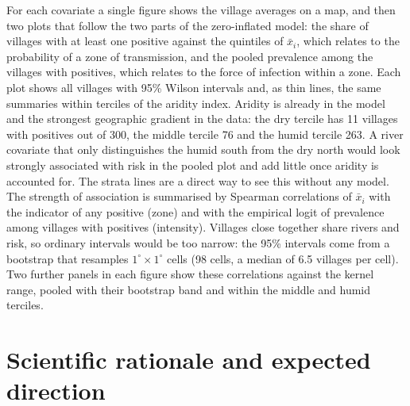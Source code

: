 \documentclass[11pt,a4paper]{article}
\begin{document}
For each covariate a single figure shows the village averages on a map, and then two plots that follow the two parts of the zero-inflated model: the share of villages with at least one positive against the quintiles of $\bar x_i$, which relates to the probability of a zone of transmission, and the pooled prevalence among the villages with positives, which relates to the force of infection within a zone. Each plot shows all villages with 95\% Wilson intervals and, as thin lines, the same summaries within terciles of the aridity index. Aridity is already in the model and the strongest geographic gradient in the data: the dry tercile has 11 villages with positives out of 300, the middle tercile 76 and the humid tercile 263. A river covariate that only distinguishes the humid south from the dry north would look strongly associated with risk in the pooled plot and add little once aridity is accounted for. The strata lines are a direct way to see this without any model. The strength of association is summarised by Spearman correlations of $\bar x_i$ with the indicator of any positive (zone) and with the empirical logit of prevalence among villages with positives (intensity). Villages close together share rivers and risk, so ordinary intervals would be too narrow: the 95\% intervals come from a bootstrap that resamples $1^\circ \times 1^\circ$ cells (98 cells, a median of 6.5 villages per cell). Two further panels in each figure show these correlations against the kernel range, pooled with their bootstrap band and within the middle and humid terciles.

\section{Scientific rationale and expected direction}
\end{document}
